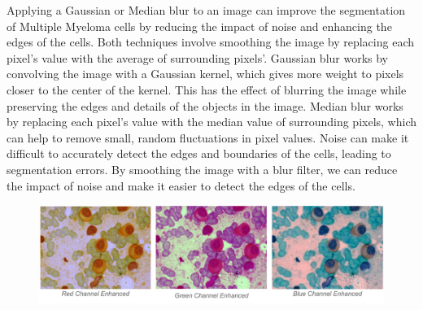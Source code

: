 \documentclass{article}
\begin{document}
Applying a Gaussian or Median blur to an image can improve the segmentation of Multiple Myeloma cells by reducing the impact of noise and enhancing the edges of the cells. Both techniques involve smoothing the image by replacing each pixel's value with the average of surrounding pixels'. Gaussian blur works by convolving the image with a Gaussian kernel, which gives more weight to pixels closer to the center of the kernel. This has the effect of blurring the image while preserving the edges and details of the objects in the image. Median blur works by replacing each pixel's value with the median value of surrounding pixels, which can help to remove small, random fluctuations in pixel values. Noise can make it difficult to accurately detect the edges and boundaries of the cells, leading to segmentation errors. By smoothing the image with a blur filter, we can reduce the impact of noise and make it easier to detect the edges of the cells.

\begin{figure}
  \centering
  \begin{minipage}{.5\textwidth}
    \centering
    \includegraphics[width=1\linewidth]{7.png}
  \end{minipage}%
\end{figure}
\end{document}
